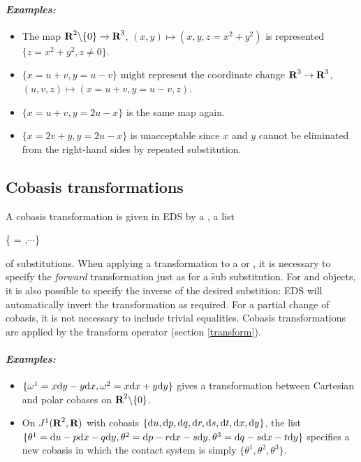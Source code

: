 \paragraph{\it Examples:}
\begin{itemize}
\item The map $\hbox{\bf R}^2\backslash\{0\}\to\hbox{\bf R}^3$, $(x,y)\mapsto (x,y,z=x^2+y^2)$
      is represented $\{z = x^2+y^2,z\neq 0\}$.
\item $\{x=u+v,y=u-v\}$ might represent the coordinate change
      $\hbox{\bf R}^3\to\hbox{\bf R}^3$, $(u,v,z)\mapsto(x=u+v,y=u-v,z)$.
\item $\{x=u+v,y=2u-x\}$ is the same map again.
\item $\{x=2v+y,y=2u-x\}$ is unacceptable since $x$ and $y$ cannot be
      eliminated from the right-hand sides by repeated substitution.
\end{itemize}

\subsection{Cobasis transformations}
\label{Cobasis transformations}

A cobasis transformation is given in EDS by a , a list
\begin{syntax}
	\{ = ,$\cdots$\}
\end{syntax}
of substitutions. When applying a transformation to a  or
, it is necessary to specify the {\it forward}
transformation just as for a \f{sub} substitution. For  and
 objects, it is also possible to specify the inverse of
the desired substition: EDS will automatically invert the transformation
as required. For a partial change of cobasis, it is not necessary to
include trivial equalities. Cobasis transformations are applied by the
\f{transform} operator (section \ref{transform}). 

\paragraph{\it Examples:}
\begin{itemize}
\item $\{\omega^1 = x{\rm d} y - y{\rm d} x, \omega^2 = x{\rm d} x + y{\rm d} y\}$ gives a
transformation between Cartesian and polar cobases on
$\hbox{\bf R}^2\backslash\{0\}$.
\item On $J^1(\hbox{\bf R}^2,\hbox{\bf R})$ with cobasis $\{{\rm d} u,{\rm d} p,{\rm d} q,{\rm d} r,{\rm d} s,{\rm d} t,{\rm d}
x,{\rm d} y\}$, the list $\{\theta^1={\rm d} u - p{\rm d} x - q{\rm d} y, \theta^2={\rm d} p -
r{\rm d} x - s{\rm d} y, \theta^3={\rm d} q - s{\rm d} x - t{\rm d} y\}$ specifies a new cobasis in
which the contact system is simply $\{\theta^1,\theta^2,\theta^3\}$.
\end{itemize}

